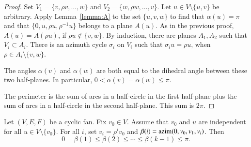 \begin{proof}   Set $V_1 = \{v,\rho v,\ldots,w\}$ and $V_2 = \{w,\rho w,\ldots,v\}$. 
Let $u\in V\setminus\{u,v\}$ be arbitrary.
Apply Lemma~\ref{lemma:A} to the set $\{u,v,w\}$ to find that $\alpha(u)=\pi$ and
that $\{0,u,\rho u,\rho^{-1} u\}$ belongs to a plane $A(u)$.   As in the previous proof, $A(u) = A(\rho u)$,
if $\rho u\not\in \{v,w\}$.  By induction, there are planes $A_1, A_2$ such that $V_i\subset A_i$.  There is
an azimuth cycle $\sigma_i$ on $V_i$ such that $\sigma_i u = \rho u$, when $\rho \in A_i\setminus \{v,w\}$.  

The angles $\alpha(v)$ and $\alpha(w)$ are both equal to the dihedral angle between these two half-planes.  In particular, $0<\alpha(v)=\alpha(w)\le\pi$.
%

The perimeter is the sum of arcs in a half-circle in the first half-plane plus
the sum of arcs in a half-circle in the second half-plane. This sum is $2\pi$.
\end{proof}




\begin{lemma}[monotonicity]  \label{lemma:monotone}
Let $(V,E,F)$ be a cyclic fan. Fix $v_0\in V$.  Assume that $v_0$ and $u$ are independent for all $u\in V\setminus\{v_0\}$.  For all $i$, set $v_i = \rho^i v_0$ and $\beta(i) = {\operatorname{azim}}(0,v_0,v_1,v_i)$.
Then
$$0=\beta(1)\le \beta(2)\le \cdots\le \beta(k-1)\le\pi.$$
%
\end{lemma}

